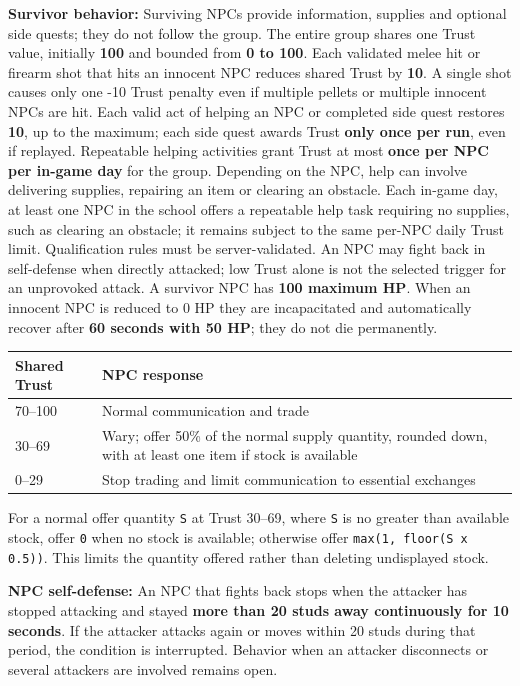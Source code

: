 \textbf{Survivor behavior:} Surviving NPCs provide information, supplies and optional side quests; they do not follow the group. The entire group shares one Trust value, initially \textbf{100} and bounded from \textbf{0 to 100}. Each validated melee hit or firearm shot that hits an innocent NPC reduces shared Trust by \textbf{10}. A single shot causes only one -10 Trust penalty even if multiple pellets or multiple innocent NPCs are hit. Each valid act of helping an NPC or completed side quest restores \textbf{10}, up to the maximum; each side quest awards Trust \textbf{only once per run}, even if replayed. Repeatable helping activities grant Trust at most \textbf{once per NPC per in-game day} for the group. Depending on the NPC, help can involve delivering supplies, repairing an item or clearing an obstacle. Each in-game day, at least one NPC in the school offers a repeatable help task requiring no supplies, such as clearing an obstacle; it remains subject to the same per-NPC daily Trust limit. Qualification rules must be server-validated. An NPC may fight back in self-defense when directly attacked; low Trust alone is not the selected trigger for an unprovoked attack. A survivor NPC has \textbf{100 maximum HP}. When an innocent NPC is reduced to 0 HP they are incapacitated and automatically recover after \textbf{60 seconds with 50 HP}; they do not die permanently.

\begin{longtable}{@{}p{}p{}@{}}
\toprule
\textbf{Shared Trust} & \textbf{NPC response} \\ \midrule\endhead
70--100 & Normal communication and trade \\
30--69 & Wary; offer 50\% of the normal supply quantity, rounded down, with at least one item if stock is available \\
0--29 & Stop trading and limit communication to essential exchanges \\
\bottomrule
\end{longtable}
For a normal offer quantity \texttt{S} at Trust 30--69, where \texttt{S} is no greater than available stock, offer \texttt{0} when no stock is available; otherwise offer \texttt{max(1, floor(S  x  0.5))}. This limits the quantity offered rather than deleting undisplayed stock.

\textbf{NPC self-defense:} An NPC that fights back stops when the attacker has stopped attacking and stayed \textbf{more than 20 studs away continuously for 10 seconds}. If the attacker attacks again or moves within 20 studs during that period, the condition is interrupted. Behavior when an attacker disconnects or several attackers are involved remains open.

